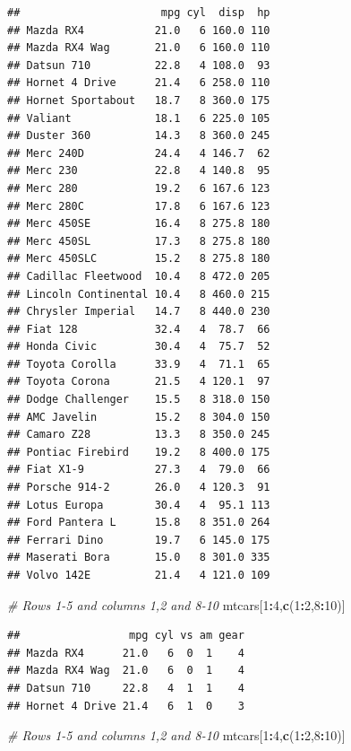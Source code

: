 \documentclass[]{book}
\newenvironment{Shaded}{\begin{snugshade}}{\end{snugshade}}
\newcommand{\CommentTok}[1]{\textcolor[rgb]{0.56,0.35,0.01}{\textit{#1}}}
\newcommand{\DecValTok}[1]{\textcolor[rgb]{0.00,0.00,0.81}{#1}}
\newcommand{\KeywordTok}[1]{\textcolor[rgb]{0.13,0.29,0.53}{\textbf{#1}}}
\newcommand{\NormalTok}[1]{#1}
\newcommand{\OperatorTok}[1]{\textcolor[rgb]{0.81,0.36,0.00}{\textbf{#1}}}
\begin{document}
\begin{verbatim}
##                      mpg cyl  disp  hp
## Mazda RX4           21.0   6 160.0 110
## Mazda RX4 Wag       21.0   6 160.0 110
## Datsun 710          22.8   4 108.0  93
## Hornet 4 Drive      21.4   6 258.0 110
## Hornet Sportabout   18.7   8 360.0 175
## Valiant             18.1   6 225.0 105
## Duster 360          14.3   8 360.0 245
## Merc 240D           24.4   4 146.7  62
## Merc 230            22.8   4 140.8  95
## Merc 280            19.2   6 167.6 123
## Merc 280C           17.8   6 167.6 123
## Merc 450SE          16.4   8 275.8 180
## Merc 450SL          17.3   8 275.8 180
## Merc 450SLC         15.2   8 275.8 180
## Cadillac Fleetwood  10.4   8 472.0 205
## Lincoln Continental 10.4   8 460.0 215
## Chrysler Imperial   14.7   8 440.0 230
## Fiat 128            32.4   4  78.7  66
## Honda Civic         30.4   4  75.7  52
## Toyota Corolla      33.9   4  71.1  65
## Toyota Corona       21.5   4 120.1  97
## Dodge Challenger    15.5   8 318.0 150
## AMC Javelin         15.2   8 304.0 150
## Camaro Z28          13.3   8 350.0 245
## Pontiac Firebird    19.2   8 400.0 175
## Fiat X1-9           27.3   4  79.0  66
## Porsche 914-2       26.0   4 120.3  91
## Lotus Europa        30.4   4  95.1 113
## Ford Pantera L      15.8   8 351.0 264
## Ferrari Dino        19.7   6 145.0 175
## Maserati Bora       15.0   8 301.0 335
## Volvo 142E          21.4   4 121.0 109
\end{verbatim}

\begin{Shaded}
\begin{Highlighting}[]
\CommentTok{# Rows 1-5 and columns 1,2 and 8-10}
\NormalTok{mtcars[}\DecValTok{1}\OperatorTok{:}\DecValTok{4}\NormalTok{,}\KeywordTok{c}\NormalTok{(}\DecValTok{1}\OperatorTok{:}\DecValTok{2}\NormalTok{,}\DecValTok{8}\OperatorTok{:}\DecValTok{10}\NormalTok{)]}
\end{Highlighting}
\end{Shaded}

\begin{verbatim}
##                 mpg cyl vs am gear
## Mazda RX4      21.0   6  0  1    4
## Mazda RX4 Wag  21.0   6  0  1    4
## Datsun 710     22.8   4  1  1    4
## Hornet 4 Drive 21.4   6  1  0    3
\end{verbatim}

\begin{Shaded}
\begin{Highlighting}[]
\CommentTok{# Rows 1-5 and columns 1,2 and 8-10}
\NormalTok{mtcars[}\DecValTok{1}\OperatorTok{:}\DecValTok{4}\NormalTok{,}\KeywordTok{c}\NormalTok{(}\DecValTok{1}\OperatorTok{:}\DecValTok{2}\NormalTok{,}\DecValTok{8}\OperatorTok{:}\DecValTok{10}\NormalTok{)]}
\end{Highlighting}
\end{Shaded}
\end{document}
